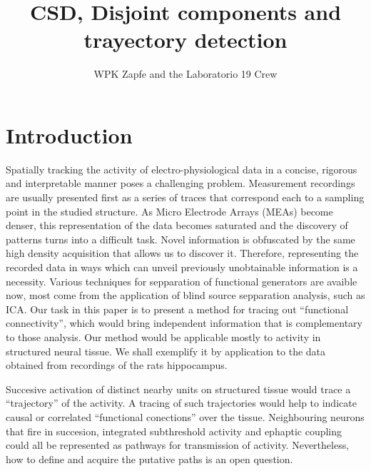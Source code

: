 \documentclass{article}
\author{WPK Zapfe and the Laboratorio 19 Crew}
\title{CSD, Disjoint components and trayectory detection}
\begin{document}
\maketitle

\section{Introduction}

Spatially tracking the activity of electro-physiological data in a concise, rigorous and interpretable manner poses a challenging problem. Measurement recordings are usually presented first as a series of traces that correspond each to a sampling point in the studied structure. As Micro Electrode Arrays (MEAs) become denser, this representation of the data becomes saturated and the discovery of patterns turns into a difficult task. Novel information is obfuscated by the same high density acquisition that allows us to discover it. Therefore, representing  the recorded data in ways which can unveil previously unobtainable information is a necessity. Various techniques for sepparation of functional generators are avaible now, most come from the application of blind source sepparation analysis, such as ICA. 
Our task in this paper is to present a method for tracing out ``functional connectivity'', which would bring independent information that is complementary to those analysis.  Our  method would be applicable mostly to activity in structured neural tissue. We shall exemplify it by application to the data obtained from recordings of the rats hippocampus. 

Succesive activation  of distinct nearby units on structured tissue would trace a ``trajectory'' of the activity. A tracing of such trajectories would help to indicate causal or correlated ``functional conections'' over the tissue. Neighbouring neurons that fire in succesion, integrated subthreshold activity and ephaptic coupling could all be represented as pathways for transmission of activity. Nevertheless, how to define and acquire the putative paths is an open question.
\end{document}
